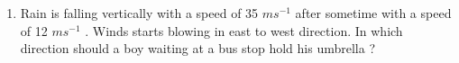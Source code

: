 \renewcommand{\theequation}{\theenumi}
\begin{enumerate}[label=\arabic*.,ref=\thesubsubsection.\theenumi]
%
\item Rain is falling vertically with a speed of 35 $m s^{-1}$
after sometime with a speed of 12 $m s^{-1}$
. Winds starts blowing in
east to west direction. In which direction should a boy waiting at a bus stop hold his umbrella ?
\end{enumerate}